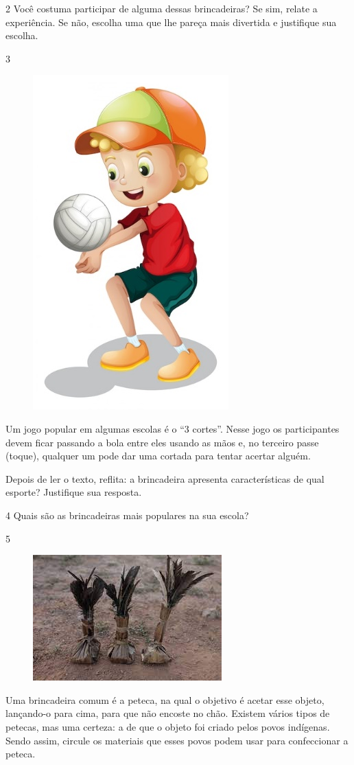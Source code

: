 \num{2} Você costuma participar de alguma dessas brincadeiras? Se sim, relate a experiência. Se não, escolha uma que lhe pareça mais divertida e justifique sua escolha.


\num{3} \begingroup
\begin{figure}
\includegraphics[width=.12\textwidth]{./imgs/img8.jpg}
\end{figure}

Um jogo popular em algumas escolas é o “3 cortes”. Nesse jogo os
  participantes devem ficar passando a bola entre eles usando as mãos e,
  no terceiro passe (toque), qualquer um pode dar uma cortada para tentar
  acertar alguém.

Depois de ler o texto, reflita: a brincadeira apresenta características de qual
esporte? Justifique sua resposta.

\endgroup\bigskip



\num{4} Quais são as brincadeiras mais populares na sua escola?


\pagebreak
\num{5}
\begin{figure}
\includegraphics[width=.2\textwidth]{./imgs/img9.jpg}
\end{figure}
Uma brincadeira comum é a peteca, na qual o objetivo é acetar esse objeto, lançando-o para cima,
  para que não encoste no chão. Existem vários tipos de petecas, mas uma certeza: a de que o objeto foi
  criado pelos povos indígenas. Sendo assim, circule os materiais que
  esses povos podem usar para confeccionar a peteca.

